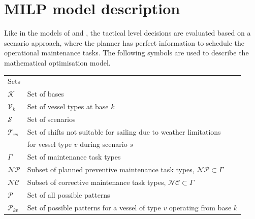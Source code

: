 \section{MILP model description}
\label{sec:mathematicalformulation}

Like in the models of \cite{HALVORSENWEARE2013} and \cite{Stalhane2016357},
 the tactical level decisions are evaluated based on a scenario approach, where the planner has perfect information to schedule the operational maintenance tasks. The following symbols are used to describe the mathematical optimisation model.


\begin{tabular}{ll}
	\multicolumn{2}{l}{Sets}\\
	$\mathcal{K}$ 				& 	Set of bases \\
	$\mathcal{V}_k$ 				& 	Set of vessel types at base $k$ \\
	$\mathcal{S}$ 				& 	Set of scenarios \\	
	$\mathcal{T}_{vs}$			&	Set of shifts not suitable for sailing due to weather limitations \\
								&	for vessel type $v$ during scenario $s$\\
	$\Gamma$ 					&	Set of maintenance task types \\
	$\mathcal{NP}$				&	Subset of planned preventive maintenance task types, $\mathcal{NP}\subset\Gamma$ \\
	$\mathcal{NC}$				&	Subset of corrective maintenance task types, $\mathcal{NC}\subset\Gamma$ \\
	$\mathcal{P}$				&	Set of all possible patterns\\
	$\mathcal{P}_{kv}$			&	\parbox[t]{10cm}{Set of possible patterns for a vessel of type $v$ operating from base $k$}\\
\end{tabular}



